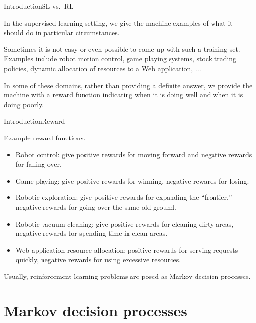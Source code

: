 \documentclass{beamer}
\begin{document}
\begin{frame}{Introduction}{SL vs.\ RL}

  In the supervised learning setting, we give the machine examples of
  what it should do in particular circumstances.

  \medskip

  Sometimes it is not easy or even possible to come up with such a
  training set.  Examples include robot motion control, game playing
  systems, stock trading policies, dynamic allocation of resources to
  a Web application, ...

  \medskip

  In some of these domains, rather than providing a definite answer,
  we provide the machine with a \alert{reward function} indicating when
  it is doing well and when it is doing poorly.


\end{frame}


\begin{frame}{Introduction}{Reward}

  Example reward functions:
  \begin{itemize}
    \item Robot control: give positive rewards for moving forward and
      negative rewards for falling over.
    \item Game playing: give positive rewards for winning, negative
      rewards for losing.
    \item Robotic exploration: give positive rewards for expanding
      the ``frontier,'' negative rewards for going over the same old
      ground.
    \item Robotic vacuum cleaning: give positive rewards for cleaning
      dirty areas, negative rewards for spending time in clean areas.
    \item Web application resource allocation: positive rewards for
      serving requests quickly, negative rewards for using excessive
      resources.
  \end{itemize}

  \medskip

  Usually, reinforcement learning problems are posed as \alert{Markov
    decision processes}.
  
\end{frame}

\section{Markov decision processes}
\end{document}
